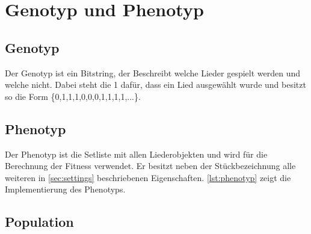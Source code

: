\section{Genotyp und Phenotyp}\label{sec:genotypPhenotyp}
\subsection{Genotyp}
Der Genotyp ist ein Bitstring, der Beschreibt welche Lieder gespielt werden und welche nicht. 
Dabei steht die 1 dafür, dass ein Lied ausgewählt wurde und besitzt so die Form
\{0,1,1,1,0,0,0,1,1,1,1,...\}.

\subsection{Phenotyp}
Der Phenotyp ist die Setliste mit allen Liederobjekten und wird für die 
Berechnung der Fitness verwendet. 
Er besitzt neben der Stückbezeichnung alle weiteren in \autoref{sec:settings} 
beschriebenen Eigenschaften. \autoref{lst:phenotyp} zeigt die Implementierung des Phenotyps.



\subsection{Population}